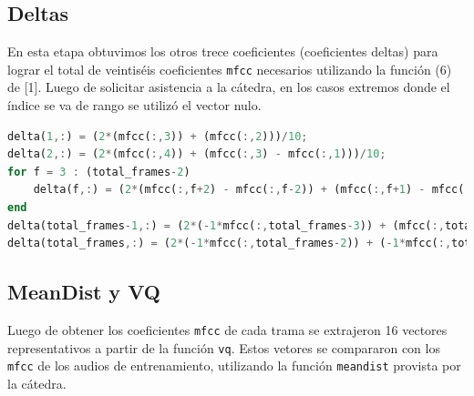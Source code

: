 \documentclass[a4paper,10pt]{article}
\begin{document}
\subsection{Deltas}
En esta etapa obtuvimos los otros trece coeficientes (coeficientes deltas) para lograr el total de veintiséis coeficientes \texttt{mfcc} necesarios utilizando la función (6) de [1].
Luego de solicitar asistencia a la cátedra, en los casos extremos donde el índice se va de rango se utilizó el vector nulo.
\newline

\begin{lstlisting}[language=Octave, caption = Extracto de la función mfcc]
delta(1,:) = (2*(mfcc(:,3)) + (mfcc(:,2)))/10;
delta(2,:) = (2*(mfcc(:,4)) + (mfcc(:,3) - mfcc(:,1)))/10;
for f = 3 : (total_frames-2)
	delta(f,:) = (2*(mfcc(:,f+2) - mfcc(:,f-2)) + (mfcc(:,f+1) - mfcc(:,f-1)))/10;
end
delta(total_frames-1,:) = (2*(-1*mfcc(:,total_frames-3)) + (mfcc(:,total_frames) - mfcc(:,total_frames-2)))/10;
delta(total_frames,:) = (2*(-1*mfcc(:,total_frames-2)) + (-1*mfcc(:,total_frames-1)))/10;
\end{lstlisting}

\subsection{MeanDist y VQ}
Luego de obtener los coeficientes \texttt{mfcc} de cada trama se extrajeron 16 vectores representativos a partir de la función \texttt{vq}.  
Estos vetores se compararon con los \texttt{mfcc} de los audios de entrenamiento, utilizando la función \texttt{meandist} provista por la cátedra.
\end{document}
